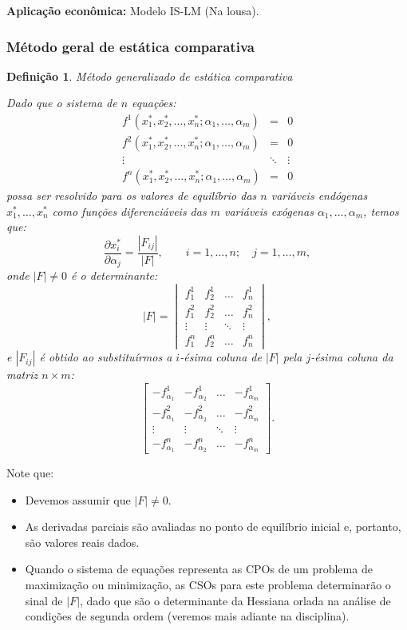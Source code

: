 \documentclass[12pt]{article}
\newtheorem{defi}{Definição}
\begin{document}
\noindent\textbf{Aplicação econômica:} Modelo IS-LM (Na lousa).

\subsubsection{Método geral de estática comparativa}

\begin{defi}{Método generalizado de estática comparativa}

Dado que o sistema de $n$ equações:
\begin{eqnarray*}
    f^1(x_1^*, x_2^*, \dots, x_n^*; \alpha_1, \dots, \alpha_m) &=& 0 \\
    f^2(x_1^*, x_2^*, \dots, x_n^*; \alpha_1, \dots, \alpha_m) &=& 0 \\
    \vdots &\ddots & \vdots \\
    f^n(x_1^*, x_2^*, \dots, x_n^*; \alpha_1, \dots, \alpha_m) &=& 0
\end{eqnarray*}
possa ser resolvido para os valores de equilíbrio das $n$ variáveis endógenas $x_1^*, \dots, x_n^*$ como funções diferenciáveis das $m$ variáveis exógenas $\alpha_1, \dots, \alpha_m$, temos que:
\[
\frac{\partial x_i^*}{\partial \alpha_j} = \frac{|F_{ij}|}{|F|}, \qquad i=1,\dots,n; \quad j=1,\dots,m,
\]
onde $|F|\neq 0$ é o determinante:
\[
|F| = \begin{vmatrix}
    f_1^1 & f_2^1 & \dots & f_n^1 \\
    f_1^2 & f_2^2 & \dots & f_n^2 \\
    \vdots & \vdots & \ddots & \vdots \\
    f_1^n & f_2^n & \dots & f_n^n
\end{vmatrix},
\]
e $|F_{ij}|$ é obtido ao substituírmos a $i$-ésima coluna de $|F|$ pela $j$-ésima coluna da matriz $n\times m$:
\[
\begin{bmatrix}
    -f_{\alpha_1}^1 & -f_{\alpha_2}^1 & \dots & -f_{\alpha_m}^1 \\
    -f_{\alpha_1}^2 & -f_{\alpha_2}^2 & \dots & -f_{\alpha_m}^2 \\
    \vdots & \vdots & \ddots & \vdots \\
    -f_{\alpha_1}^n & -f_{\alpha_2}^n & \dots & -f_{\alpha_m}^n
\end{bmatrix}.
\]
\label{def1}
\end{defi}

Note que:
\begin{itemize}
    \item Devemos assumir que $|F| \neq 0$.
    \item As derivadas parciais são avaliadas no ponto de equilíbrio inicial e, portanto, são valores reais dados.
    \item Quando o sistema de equações representa as CPOs de um problema de maximização ou minimização, as CSOs para este problema determinarão o sinal de $|F|$, dado que são o determinante da Hessiana orlada na análise de condições de segunda ordem (veremos mais adiante na disciplina).
\end{itemize}
\end{document}
